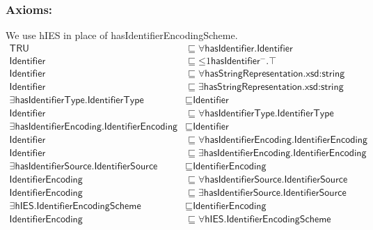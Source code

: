 \subsubsection*{Axioms:}
We use \textsf{hIES} in place of \textsf{hasIdentifierEncodingScheme}.
\begin{align}
    \textsf{TRU} &\sqsubseteq \forall\textsf{hasIdentifier.Identifier}\\
    \textsf{Identifier} &\sqsubseteq \mathord{\leq} 1\textsf{hasIdentifier}\mathord{^-}.\top\\
    \textsf{Identifier} &\sqsubseteq \forall\textsf{hasStringRepresentation.xsd:string}\\
    \textsf{Identifier} &\sqsubseteq \exists\textsf{hasStringRepresentation.xsd:string}\\
    \exists\textsf{hasIdentifierType.IdentifierType} &\sqsubseteq \textsf{Identifier}\\
    \textsf{Identifier} &\sqsubseteq \forall\textsf{hasIdentifierType.IdentifierType}\\
    \exists\textsf{hasIdentifierEncoding.IdentifierEncoding} &\sqsubseteq \textsf{Identifier}\\
    \textsf{Identifier} &\sqsubseteq \forall\textsf{hasIdentifierEncoding.IdentifierEncoding}\\
    \textsf{Identifier} &\sqsubseteq \exists\textsf{hasIdentifierEncoding.IdentifierEncoding}\\ 
    \exists\textsf{hasIdentifierSource.IdentifierSource} &\sqsubseteq \textsf{IdentifierEncoding}\\
    \textsf{IdentifierEncoding} &\sqsubseteq\forall \textsf{hasIdentifierSource.IdentifierSource}\\ 
    \textsf{IdentifierEncoding} &\sqsubseteq\exists\textsf{hasIdentifierSource.IdentifierSource}\\
    \exists\textsf{hIES.IdentifierEncodingScheme} &\sqsubseteq \textsf{IdentifierEncoding}\\
    \textsf{IdentifierEncoding}&\sqsubseteq\forall\textsf{hIES.IdentifierEncodingScheme} 
\end{align}

